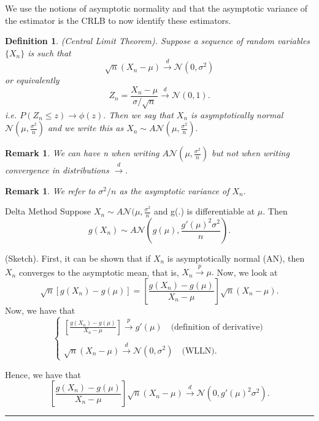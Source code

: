 \documentclass[twoside]{article}
\newtheorem{definition}[theorem]{Definition}
\newtheorem{remark}[theorem]{Remark}
\newenvironment{proof}{{\bf Proof:}}{\hfill\rule{2mm}{2mm}}
\begin{document}
We use the notions of asymptotic normality and that the asymptotic variance of the estimator is the CRLB to now identify these estimators.

\begin{definition}(Central Limit Theorem). Suppose a sequence of random variables $\{X_n\}$ is such that 
$$
\sqrt{n}(X_n - \mu) \xrightarrow{d} \mathcal{N}(0, \sigma^2)
$$
or equivalently 
$$
Z_n = \frac{X_n - \mu}{\sigma/\sqrt{n}} \xrightarrow{d} \mathcal{N}(0, 1).
$$
i.e. $P(Z_n \leq z) \rightarrow \phi (z).$
Then we say that $X_n$ is asymptotically normal $\mathcal{N}(\mu, \frac{\sigma^2}{n})$ and we write this as $X_n \sim A\mathcal{N}(\mu, \frac{\sigma^2}{n}).$
\end{definition}

\begin{remark}We can have n when writing $A\mathcal{N}(\mu, \frac{\sigma^2}{n})$ but not when writing convergence in distributions $\xrightarrow{d}.$
\end{remark}


\begin{remark}We refer to $\sigma^2/n$ as the asymptotic variance of $X_n.$
\end{remark}

\begin{theorem_exam}{Delta Method}{} Suppose $X_n \sim A\mathcal{N}(\mu, \frac{\sigma^2}{n}$ and g(.) is differentiable at $\mu$. Then 
$$
g(X_n) \sim A\mathcal{N}(g(\mu), \frac{g'(\mu)^2\sigma^2}{n}).
$$
\end{theorem_exam}

\begin{proof}(Sketch). First, it can be shown that if $X_n$ is asymptotically normal (AN), then $X_n$ converges to the asymptotic mean, that is, $X_n \xrightarrow{p} \mu.$ Now, we look at 
$$
\sqrt{n}[g(X_n) - g(\mu)] = [\frac{g(X_n) - g(\mu)}{X_n - \mu}]\sqrt{n}(X_n - \mu).
$$
Now, we have that 
$$
\begin{cases}
[\frac{g(X_n) - g(\mu)}{X_n - \mu}] \xrightarrow{p} g'(\mu) \quad \text{(definition of derivative)}\\
\\
\sqrt{n}(X_n - \mu) \xrightarrow{d} \mathcal{N}(0, \sigma^2) \quad \text{(WLLN)}.
\end{cases}
$$


Hence, we have that 
$$
[\frac{g(X_n) - g(\mu)}{X_n - \mu}]\sqrt{n}(X_n - \mu) \xrightarrow{d} \mathcal{N}(0, g'(\mu)^2\sigma^2).
$$
\end{proof}
\end{document}
